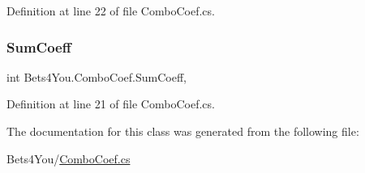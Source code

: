 Definition at line 22 of file Combo\+Coef.\+cs.

\mbox{\label{class_bets4_you_1_1_combo_coef_a50cb46468caccfcf79d66121f65b38e9}} 
\subsubsection{\texorpdfstring{SumCoeff}{SumCoeff}}
{\footnotesize\ttfamily int Bets4\+You.\+Combo\+Coef.\+Sum\+Coeff\hspace{0.3cm}{\ttfamily [get]}, {\ttfamily [set]}}



Definition at line 21 of file Combo\+Coef.\+cs.



The documentation for this class was generated from the following file\+:\begin{DoxyCompactItemize}
\item 
Bets4\+You/\mbox{\hyperlink{_combo_coef_8cs}{Combo\+Coef.\+cs}}\end{DoxyCompactItemize}
